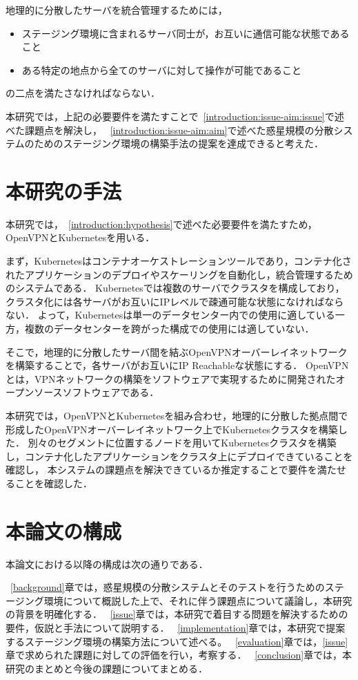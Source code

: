 地理的に分散したサーバを統合管理するためには，
\begin{itemize}
  \item ステージング環境に含まれるサーバ同士が，お互いに通信可能な状態であること
  \item ある特定の地点から全てのサーバに対して操作が可能であること
\end{itemize}
の二点を満たさなければならない．

本研究では，上記の必要要件を満たすことで~\ref{introduction:issue-aim:issue}で述べた課題点を解決し，
~\ref{introduction:issue-aim:aim}で述べた惑星規模の分散システムのためのステージング環境の構築手法の提案を達成できると考えた．

\section{本研究の手法}
\label{introduction:proposal}

本研究では，~\ref{introduction:hypothesis}で述べた必要要件を満たすため，OpenVPNとKubernetesを用いる．

まず，Kubernetesはコンテナオーケストレーションツールであり，コンテナ化されたアプリケーションのデプロイやスケーリングを自動化し，統合管理するためのシステムである．
Kubernetesでは複数のサーバでクラスタを構成しており，クラスタ化には各サーバがお互いにIPレベルで疎通可能な状態になければならない．
よって，Kubernetesは単一のデータセンター内での使用に適している一方，複数のデータセンターを跨がった構成での使用には適していない．

そこで，地理的に分散したサーバ間を結ぶOpenVPNオーバーレイネットワークを構築することで，各サーバがお互いにIP Reachableな状態にする．
OpenVPNとは，VPNネットワークの構築をソフトウェアで実現するために開発されたオープンソースソフトウェアである．

本研究では，OpenVPNとKubernetesを組み合わせ，地理的に分散した拠点間で形成したOpenVPNオーバーレイネットワーク上でKubernetesクラスタを構築した．
別々のセグメントに位置するノードを用いてKubernetesクラスタを構築し，コンテナ化したアプリケーションをクラスタ上にデプロイできていることを確認し，
本システムの課題点を解決できているか推定することで要件を満たせることを確認した．

\section{本論文の構成}
\label{introduction:structure}

本論文における以降の構成は次の通りである．

~\ref{background}章では，惑星規模の分散システムとそのテストを行うためのステージング環境について概説した上で、それに伴う課題点について議論し，本研究の背景を明確化する．
~\ref{issue}章では，本研究で着目する問題を解決するための要件，仮説と手法について説明する．
~\ref{implementation}章では，本研究で提案するステージング環境の構築方法について述べる。
~\ref{evaluation}章では，\ref{issue}章で求められた課題に対しての評価を行い，考察する．
~\ref{conclusion}章では，本研究のまとめと今後の課題についてまとめる．

